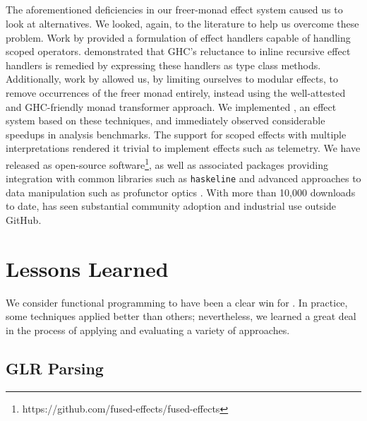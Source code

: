 \documentclass[acmsmall,fleqn,12pt]{acmart}
\begin{document}
\subsection{\fe{}}

The aforementioned deficiencies in our freer-monad effect system caused us
to look at alternatives. We looked, again, to the literature to help us
overcome these problem. Work by \citet{wu2014effect} provided a formulation
of effect handlers capable of handling scoped operators. \citet{wu15fusion}
demonstrated that GHC's reluctance to inline recursive effect handlers is
remedied by expressing these handlers as type class methods. Additionally,
work by \citet{Schrijvers19Monad} allowed us, by limiting ourselves to
modular effects, to remove occurrences of the freer monad entirely, instead
using the well-attested and GHC-friendly monad transformer approach. We
implemented \fe{}, an effect system based on these techniques, and
immediately observed considerable speedups in analysis benchmarks. The \fe{}
support for scoped effects with multiple interpretations rendered it trivial
to implement effects such as telemetry. We have released \fe{} as
open-source
software\footnote{https://github.com/fused-effects/fused-effects}, as well
as associated packages providing integration with common libraries such as
\texttt{haskeline} and advanced approaches to data manipulation such as
profunctor optics \cite{Pickering17Profunctor}. With more than 10,000
downloads to date, \fe{} has seen substantial community adoption and
industrial use outside GitHub.

\section{Lessons Learned}
\label{sec:lessons}

We consider functional programming to have been a clear win for \semantic{}.
In practice, some techniques applied better than others; nevertheless, we learned
a great deal in the process of applying and evaluating a variety of approaches.

\subsection{GLR Parsing}
\end{document}
